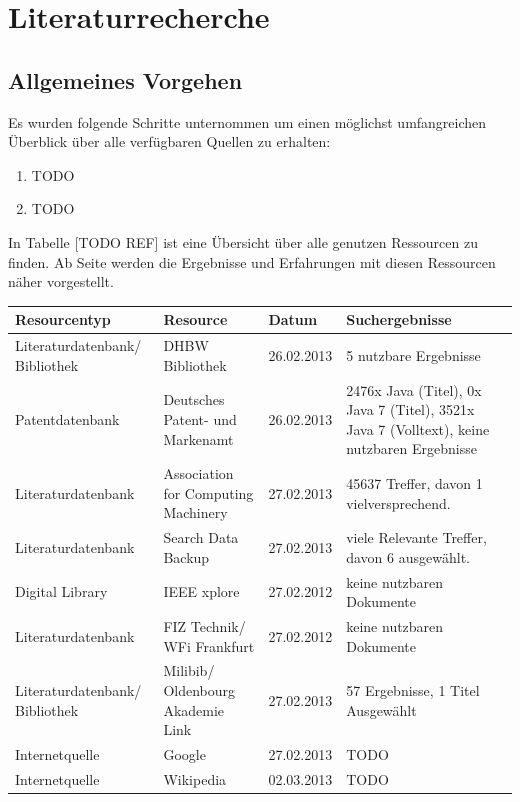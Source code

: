 \section{Literaturrecherche}

\subsection{Allgemeines Vorgehen}

Es wurden folgende Schritte unternommen um einen möglichst umfangreichen Überblick über alle verfügbaren Quellen zu erhalten:
\begin{enumerate}
\item TODO
\item TODO
\end{enumerate}
In Tabelle [TODO REF] ist eine Übersicht über alle genutzen Ressourcen zu finden. Ab Seite \pageref{startdetails} werden die Ergebnisse und Erfahrungen mit diesen Ressourcen näher vorgestellt.

\renewcommand{\arraystretch}{1.5}
\begin{longtable}{p{3.6cm}|p{3.5cm}|l|p{3.5cm}}
Resourcentyp & Resource & Datum & Suchergebnisse\\\hline\endhead
\endfoot\endlastfoot
Literaturdatenbank/ Bibliothek & DHBW Bibliothek & 26.02.2013 & 5 nutzbare Ergebnisse\\
Patentdatenbank & Deutsches Patent- und Markenamt & 26.02.2013 & 2476x Java (Titel), 0x Java 7 (Titel), 3521x Java 7 (Volltext), keine nutzbaren Ergebnisse\\
Literaturdatenbank & Association for Computing Machinery & 27.02.2013 & 45637 Treffer, davon 1 vielversprechend.\\
Literaturdatenbank & Search Data Backup & 27.02.2013 & viele Relevante Treffer, davon 6 ausgewählt.\\
Digital Library & IEEE xplore & 27.02.2012 & keine nutzbaren Dokumente\\
Literaturdatenbank & FIZ Technik/ WFi Frankfurt & 27.02.2012 & keine nutzbaren Dokumente\\
Literaturdatenbank/ Bibliothek & Milibib/ Oldenbourg Akademie Link & 27.02.2013 & 57 Ergebnisse, 1 Titel Ausgewählt\\
Internetquelle & Google & 27.02.2013 & TODO\\
Internetquelle & Wikipedia & 02.03.2013 & TODO\\
\end{longtable}
\renewcommand{\arraystretch}{1}

